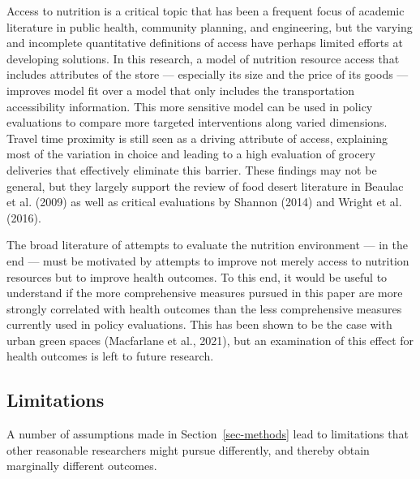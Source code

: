 \documentclass[
  letterpaper,
  number,
  review,
  3p]{elsarticle}
\begin{document}
Access to nutrition is a critical topic that has been a frequent focus
of academic literature in public health, community planning, and
engineering, but the varying and incomplete quantitative definitions of
access have perhaps limited efforts at developing solutions. In this
research, a model of nutrition resource access that includes attributes
of the store --- especially its size and the price of its goods ---
improves model fit over a model that only includes the transportation
accessibility information. This more sensitive model can be used in
policy evaluations to compare more targeted interventions along varied
dimensions. Travel time proximity is still seen as a driving attribute
of access, explaining most of the variation in choice and leading to a
high evaluation of grocery deliveries that effectively eliminate this
barrier. These findings may not be general, but they largely support the
review of food desert literature in Beaulac et al. (2009) as well as
critical evaluations by Shannon (2014) and Wright et al. (2016).

The broad literature of attempts to evaluate the nutrition environment
--- in the end --- must be motivated by attempts to improve not merely
access to nutrition resources but to improve health outcomes. To this
end, it would be useful to understand if the more comprehensive measures
pursued in this paper are more strongly correlated with health outcomes
than the less comprehensive measures currently used in policy
evaluations. This has been shown to be the case with urban green spaces
(Macfarlane et al., 2021), but an examination of this effect for health
outcomes is left to future research.

\subsection{Limitations}\label{sec-limitations}

A number of assumptions made in Section~\ref{sec-methods} lead to
limitations that other reasonable researchers might pursue differently,
and thereby obtain marginally different outcomes.
\end{document}
